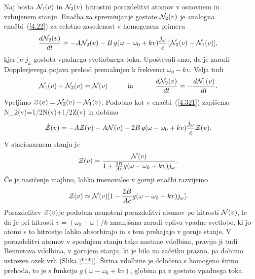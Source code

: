 Naj bosta ${\cal N}_{1}(v)$ in ${\cal N}_{2}(v)$ hitrostni porazdelitvi
atomov v osnovnem in vzbujenem stanju. Enačba za spreminjanje gostote
${\cal N}_{2}(v)$ je analogna enačbi~(\ref{4.22}) za celotno
zasedenost v homogenem primeru
\begin{equation}
\frac{d{\cal N}_{2}(v)}{dt}=-A{\cal N}_{2}(v) -B\, g(\omega-\omega_{0}+kv)
\frac{j_{\omega}}{c}\,
[{\cal N}_{2}(v)-{\cal N}_{1}(v)],
\label{4.85}
\end{equation}
 kjer je $j_{\omega}$ gostota vpadnega svetlobnega toka. Upoštevali
smo, da je zaradi Dopplerjevega pojava prehod premaknjen k frekvenci
$\omega_{0}-kv$. Velja tudi
\begin{equation}
{\cal N}_{1}(v)+{\cal N}_{2}(v)={\cal N}(v)\mbox{\hskip1cm in \hskip1cm}\frac{d{\cal N}_{2}(v)}{dt}=-\frac{d{\cal N}_{1}(v)}{dt}.
\label{4.86}
\end{equation}
Vpeljimo ${\cal Z}(v)={\cal N}_{2}(v)-{\cal N}_{1}(v)$. Podobno kot 
v enačbi~(\ref{4.321}) zapišemo
\beq
{\cal N}_{2}(v)=1/2{\cal N}(v)+1/2{\cal Z}(v)
\eeq
in dobimo 
\begin{equation}
\dot{{\cal Z}}(v)=-A{\cal Z}(v)-A{\cal N}(v)
-2B\,g(\omega-\omega_{0}+kv)\frac{j_{\omega}}{c}
{\cal Z}(v).
\label{4.87}
\end{equation}
V stacionarnem stanju je 
\begin{equation}
{\cal Z}(v)=\frac{{\cal N}(v)}{1+\frac{2B}{Ac}g(\omega-\omega_{0}+kv)j_{\omega}}.\label{4.88}
\end{equation}
 Če je nasičenje majhno, lahko imenovalec v gornji enačbi razvijemo
\begin{equation}
{\cal Z}(v)\simeq{\cal N}(v)[1-\frac{2B}{Ac}g(\omega-\omega_{0}+kv)j_{\omega}].\label{4.89}
\end{equation}
 Porazdelitev ${\cal Z}(v)$je podobna nemoteni porazdelitvi atomov
po hitrosti ${\cal N}(v)$, le da je pri hitrosti $v=(\omega_{0}-\omega)/k$
zmanjšana zaradi vpliva vpadne svetlobe, ki jo atomi s to hitrostjo
lahko absorbirajo in s tem prehajajo v gornje stanje. V porazdelitvi
atomov v spodnjem stanju tako nastane vdolbina, pravijo ji tudi Bennetova
vdolbina, v gornjem stanju, ki je bilo na začetku prazno, pa dobimo
ustrezen ozek vrh (Slika \ref{***}). Širina vdolbine je določena
s homogeno širino prehoda, to je s funkcijo $g(\omega-\omega_{0}+kv)$,
globina pa z gostoto vpadnega toka.

